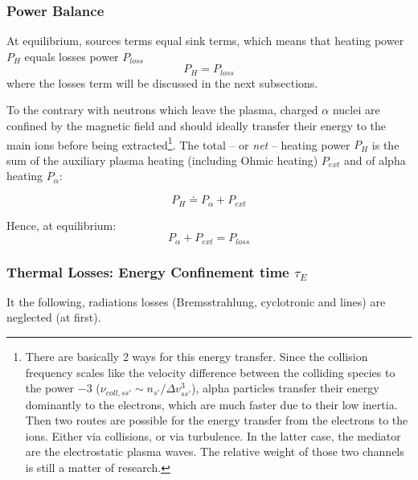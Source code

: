 \subsubsection{Power Balance}
At equilibrium, sources terms equal sink terms, which means that heating power $P_H$ equals losses power $P_{loss}$
\begin{equation}
	P_H = P_{loss}
	\label{eq:power_balance_general}
\end{equation}
where the losses term will be discussed in the next subsections.


To the contrary with neutrons which leave the plasma, charged $\alpha$ nuclei are confined by the magnetic field and should ideally transfer their energy to the main ions before being extracted\footnote{There are basically 2 ways for this energy transfer. Since the collision frequency scales like the velocity difference between the colliding species to the power $-3$ ($\nu_{coll,ss'}\sim n_{s'}/\Delta v_{ss'}^3$), alpha particles transfer their energy dominantly to the electrons, which are much faster due to their low inertia. Then two routes are possible for the energy transfer from the electrons to the ions. Either via collisions, or via turbulence. In the latter case, the mediator are the electrostatic plasma waves. The relative weight of those two channels is still a matter of research.}. The total -- or \emph{net} -- heating power $P_H$ is the sum of the auxiliary plasma heating (including Ohmic heating) $P_{ext}$ and of alpha heating $P_\alpha$:

\begin{equation}
P_{H} \doteq P_\alpha + P_{ext}
\label{eq:definition_net_power}
\end{equation}

\noindent
Hence, at equilibrium: 
\begin{equation}
	P_\alpha + P_{ext} = P_{loss}
	\label{eq:power_balance_simplified}
\end{equation}



\subsubsection{Thermal Losses: Energy Confinement time $\tau_E$}

It the following, radiations losses (Bremsstrahlung, cyclotronic and lines) are neglected (at first). 

